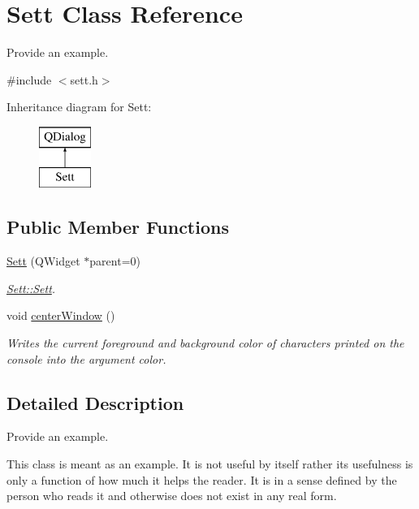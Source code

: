 \hypertarget{class_sett}{\section{Sett Class Reference}
\label{class_sett}
}


Provide an example.  




{\ttfamily \#include $<$sett.\+h$>$}

Inheritance diagram for Sett\+:\begin{figure}[H]
\begin{center}
\leavevmode
\includegraphics[height=2.000000cm]{class_sett}
\end{center}
\end{figure}
\subsection*{Public Member Functions}
\begin{DoxyCompactItemize}
\item 
\hyperlink{class_sett_abbc0a2f51e953575a6d456eee64a96de}{Sett} (Q\+Widget $\ast$parent=0)
\begin{DoxyCompactList}\small\item\em \hyperlink{class_sett_abbc0a2f51e953575a6d456eee64a96de}{Sett\+::\+Sett}. \end{DoxyCompactList}\item 
void \hyperlink{class_sett_a9e898b5c9359f7fb52910315d023283c}{center\+Window} ()
\begin{DoxyCompactList}\small\item\em Writes the current foreground and background color of characters printed on the console into the argument color. \end{DoxyCompactList}\end{DoxyCompactItemize}


\subsection{Detailed Description}
Provide an example. 

This class is meant as an example. It is not useful by itself rather its usefulness is only a function of how much it helps the reader. It is in a sense defined by the person who reads it and otherwise does not exist in any real form.

